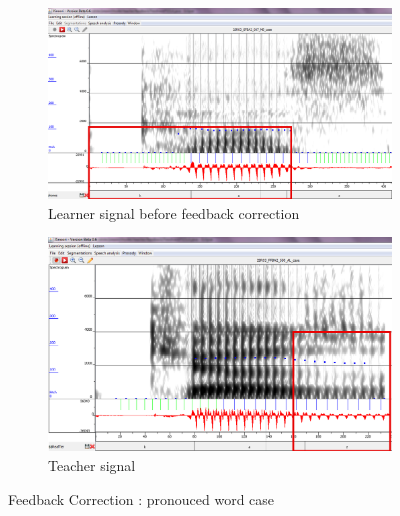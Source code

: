 \documentclass[11pt]{beamer}
\begin{document}
\begin{frame}

\begin{figure}
\begin{subfigure}{.5\textwidth}
  \centering
  \includegraphics[width=0.9\linewidth]{images/case_learner-pitchMarkers.PNG}
  \caption{Learner signal before feedback correction}
  \label{fig:sfig1}
\end{subfigure}%
\begin{subfigure}{.5\textwidth}
  \centering
  \includegraphics[width=0.9\linewidth]{images/teacher_case_Fricative.PNG}
  \caption{Teacher signal}
  \label{fig:sfig2}
\end{subfigure}
\caption{Feedback Correction : pronouced word case}
\label{fig:fig}
\end{figure}
\end{frame}
\end{document}
